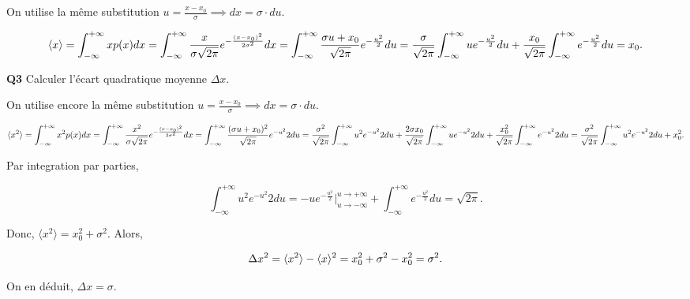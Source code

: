 \documentclass[french]{article}
\begin{document}
{		On utilise la même substitution $u = \frac{x - x_0}{\sigma} \implies dx = \sigma \cdot du$.
		
		\begin{dmath}
			\langle x \rangle = \int_{-\infty}^{+\infty} xp(x) dx \\ 
			= \int_{-\infty}^{+\infty} \frac{x}{\sigma \sqrt{2\pi}}e^{-\frac{(x-x_0)^2}{2\sigma^2}} dx \\
			= \int_{-\infty}^{+\infty} \frac{\sigma u + x_0}{\sqrt{2\pi}}e^{-\frac{u^2}{2}} du \\
			= \frac{\sigma}{\sqrt{2\pi}} \int_{-\infty}^{+\infty} ue^{-\frac{u^2}{2}} du + \frac{x_0}{\sqrt{2\pi}}\int_{-\infty}^{+\infty} e^{-\frac{u^2}{2}} du \\
			= x_0.
		\end{dmath}
	
		
		\begin{tcolorbox}[colback=gray!5!white,colframe=gray!75!black]
			\textbf{\large{Q3}} Calculer l'écart quadratique moyenne $\Delta x$.
		\end{tcolorbox}
	
		On utilise encore la même substitution $u = \frac{x - x_0}{\sigma} \implies dx = \sigma \cdot du$.
		
		\begin{dmath}
			\langle x^2 \rangle = \int_{-\infty}^{+\infty} x^2p(x) dx \\ 
			= \int_{-\infty}^{+\infty} \frac{x^2}{\sigma \sqrt{2\pi}}e^{-\frac{(x-x_0)^2}{2\sigma^2}} dx \\
			= \int_{-\infty}^{+\infty} \frac{(\sigma u + x_0)^2}{\sqrt{2\pi}}e^{-u^2}{2} du \\
			= \frac{\sigma^2}{\sqrt{2\pi}} \int_{-\infty}^{+\infty} u^2e^{-u^2}{2} du + \frac{2\sigma x_0}{\sqrt{2\pi}} \int_{-\infty}^{+\infty} ue^{-u^2}{2} du + \frac{x_0^2}{\sqrt{2\pi}} \int_{-\infty}^{+\infty} e^{-u^2}{2} du\\
			= \frac{\sigma^2}{\sqrt{2\pi}} \int_{-\infty}^{+\infty} u^2e^{-u^2}{2} du + x_0^2.
		\end{dmath}
	
		Par integration par parties,
		
		\begin{equation}
			\int_{-\infty}^{+\infty} u^2e^{-u^2}{2} du = -ue^{-\frac{u^2}{2}}\bigg\rvert_{u \to -\infty}^{u \to +\infty} + \int_{-\infty}^{+\infty} e^{-\frac{u^2}{2}} du = \sqrt{2\pi}.
		\end{equation}
		
		Donc, $\langle x^2 \rangle = x_0^2 + \sigma^2$. Alors,
		
		\begin{dmath}
			\Delta x^2 = \langle x^2 \rangle - \langle x \rangle^2\\
			= x_0^2 + \sigma^2 - x_0^2\\
			=\sigma^2.
		\end{dmath}
	
		On en déduit, $\Delta x = \sigma$.
		
	}
\end{document}
